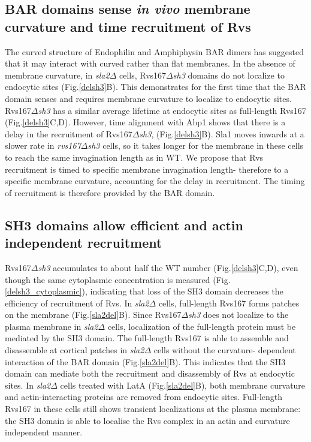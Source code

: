 \documentclass[9pt,lineno]{elife}
\begin{document}
\subsection{BAR domains sense \textit{in vivo} membrane curvature and time recruitment of Rvs}
The curved structure of Endophilin and Amphiphysin BAR dimers \citep{Peters2004,Mim2012} has suggested that it may interact with curved rather than flat membranes. In the absence of membrane curvature, in \textit{sla2$\Delta$} cells, Rvs167\textit{$\Delta$sh3} domains do not localize to endocytic sites (Fig.\ref{delsh3}B). This demonstrates for the first time that the BAR domain senses and requires membrane curvature to localize to endocytic sites. Rvs167\textit{$\Delta$sh3} has a similar average lifetime at endocytic sites as full-length Rvs167 (Fig.\ref{delsh3}C,D). However, time alignment with Abp1 shows that there is a delay in the recruitment of Rvs167\textit{$\Delta$sh3}, (Fig.\ref{delsh3}B). Sla1 moves inwards at a slower rate in \textit{rvs167$\Delta$sh3} cells, so it takes longer for the membrane in these cells to reach the same invagination length as in WT. We propose that Rvs recruitment is timed to specific membrane invagination length- therefore to a specific membrane curvature,  accounting for the delay in recruitment. The timing of recruitment is therefore provided by the BAR domain.  

\subsection{SH3 domains allow efficient and actin independent recruitment}
Rvs167\textit{$\Delta$sh3} accumulates to about half the WT number (Fig.\ref{delsh3}C,D), even though the same cytoplasmic concentration is measured (Fig.\ref{delsh3_cytoplasmic}), indicating that loss of the SH3 domain decreases the efficiency of recruitment of Rvs. In \textit{sla2$\Delta$} cells, full-length Rvs167 forms patches on the membrane (Fig.\ref{sla2del}B). Since Rvs167\textit{$\Delta$sh3} does not localize to the plasma membrane in \textit{sla2$\Delta$} cells, localization of the full-length protein must be mediated by the SH3 domain. The full-length Rvs167 is able to assemble and disassemble at cortical patches in \textit{sla2$\Delta$} cells without the curvature- dependent interaction of the BAR domain (Fig.\ref{sla2del}B). This indicates that the SH3 domain can mediate both the recruitment and disassembly of Rvs at endocytic sites. In \textit{sla2$\Delta$} cells treated with LatA (Fig.\ref{sla2del}B), both membrane curvature and actin-interacting proteins are removed from endocytic sites. Full-length Rvs167 in these cells still shows transient localizations at the plasma membrane: the SH3 domain is able to localise the Rvs complex in an actin and curvature independent manner.  
\end{document}
